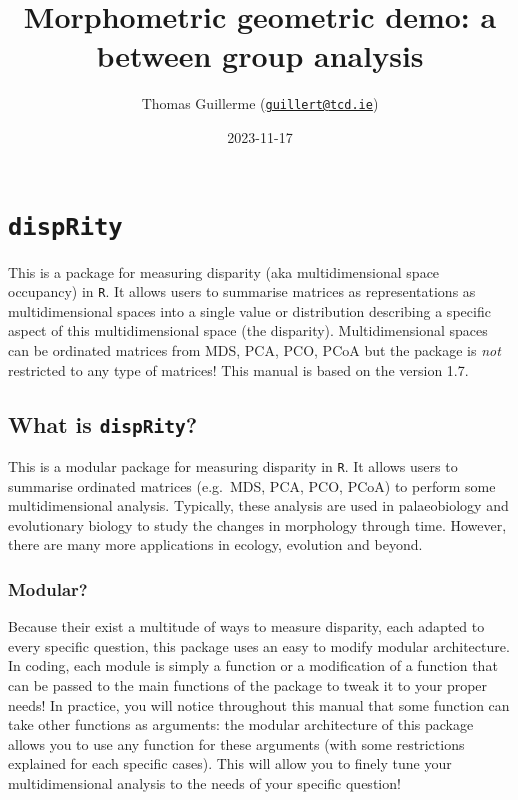 \documentclass[
]{book}
\title{Morphometric geometric demo: a between group analysis}
\author{Thomas Guillerme (\href{mailto:guillert@tcd.ie}{\nolinkurl{guillert@tcd.ie}})}
\date{2023-11-17}
\begin{document}
\maketitle

{
\setcounter{tocdepth}{1}
\tableofcontents
}
\hypertarget{disprity}{%
\chapter{\texorpdfstring{\texttt{dispRity}}{dispRity}}\label{disprity}}

This is a package for measuring disparity (aka multidimensional space occupancy) in \texttt{R}.
It allows users to summarise matrices as representations as multidimensional spaces into a single value or distribution describing a specific aspect of this multidimensional space (the disparity).
Multidimensional spaces can be ordinated matrices from MDS, PCA, PCO, PCoA but the package is \emph{not} restricted to any type of matrices!
This manual is based on the version 1.7.

\hypertarget{what-is-disprity}{%
\section{\texorpdfstring{What is \texttt{dispRity}?}{What is dispRity?}}\label{what-is-disprity}}

This is a modular package for measuring disparity in \texttt{R}.
It allows users to summarise ordinated matrices (e.g.~MDS, PCA, PCO, PCoA) to perform some multidimensional analysis.
Typically, these analysis are used in palaeobiology and evolutionary biology to study the changes in morphology through time.
However, there are many more applications in ecology, evolution and beyond.

\hypertarget{modular}{%
\subsection{Modular?}\label{modular}}

Because their exist a multitude of ways to measure disparity, each adapted to every specific question, this package uses an easy to modify modular architecture.
In coding, each module is simply a function or a modification of a function that can be passed to the main functions of the package to tweak it to your proper needs!
In practice, you will notice throughout this manual that some function can take other functions as arguments: the modular architecture of this package allows you to use any function for these arguments (with some restrictions explained for each specific cases).
This will allow you to finely tune your multidimensional analysis to the needs of your specific question!
\end{document}
